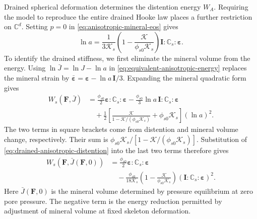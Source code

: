 Drained spherical deformation determines the distention energy \(W_A\).
Requiring the model to reproduce the entire drained Hooke law places a
further restriction on \(\mathbb{C}^d\).
Setting \(p=0\) in \eqref{eq:anisotropic-mineral-eos} gives
\begin{equation}
 \ln a=\frac1{3\mathcal{K}_s}\left(1-\frac{\mathcal{K}}{\phi_{s0}\mathcal{K}_s}\right)
                  \mathbf I:\mathbb{C}_s:\mathbf\varepsilon.
 \label{eq:drained-anisotropic-distention}
\end{equation}
To identify the drained stiffness, we first eliminate the mineral volume
from the energy. Using \(\ln\bar J=\ln J-\ln a\) in
\eqref{eq:equivalent-anisotropic-energy} replaces the mineral strain by
\(\bar{\mathbf\varepsilon}=\mathbf\varepsilon-\ln a\,\mathbf I/3\).
Expanding the mineral quadratic form gives
\begin{align}
 W_s(\mathbf F,\bar J)
 &=\frac{\phi_{s0}}2\mathbf\varepsilon:\mathbb{C}_s:\mathbf\varepsilon
 -\frac{\phi_{s0}}3\ln a\,
       \mathbf I:\mathbb{C}_s:\mathbf\varepsilon
 \nonumber\\
 &\quad+\frac12\left[
   \frac{\mathcal{K}}{1-\mathcal{K}/(\phi_{s0}\mathcal{K}_s)}
   +\phi_{s0}\mathcal{K}_s\right](\ln a)^2.
 \label{eq:drained-energy-before-elimination}
\end{align}
The two terms in square brackets come from distention and mineral volume
change, respectively. Their sum is
\(\phi_{s0}\mathcal{K}_s/[1-\mathcal{K}/(\phi_{s0}\mathcal{K}_s)]\).
Substitution of \eqref{eq:drained-anisotropic-distention} into the last
two terms therefore gives
\begin{align}
 W_s(\mathbf F,\bar J(\mathbf F,0))
 &=\frac{\phi_{s0}}2\mathbf\varepsilon:\mathbb{C}_s:\mathbf\varepsilon
 \nonumber\\
 &\quad-\frac{\phi_{s0}}{18\mathcal{K}_s}
 \left(1-\frac{\mathcal{K}}{\phi_{s0}\mathcal{K}_s}\right)
 \left(\mathbf I:\mathbb{C}_s:\mathbf\varepsilon\right)^2.
 \label{eq:drained-energy-after-elimination}
\end{align}
Here \(\bar J(\mathbf F,0)\) is the mineral volume determined by pressure
equilibrium at zero pore pressure. The negative term is the energy
reduction permitted by adjustment of mineral volume at fixed skeleton
deformation.

